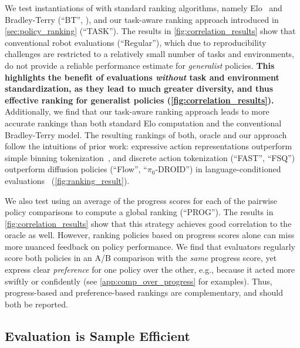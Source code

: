 We test instantiations of \Acronym{} with standard ranking algorithms, namely Elo~\citep{elo1967proposed} and Bradley-Terry (``BT'', \citep{bradley1952rank}), and our task-aware ranking approach introduced in \cref{sec:policy_ranking} (``TASK''). The results in \cref{fig:correlation_results} show that conventional robot evaluations (``Regular''), which due to reproducibility challenges are restricted to a relatively small number of tasks and environments, do not provide a reliable performance estimate for \emph{generalist} policies. \textbf{This highlights the benefit of evaluations \emph{without} task and environment standardization, as they lead to much greater diversity, and thus effective ranking for generalist policies (\cref{fig:correlation_results}).} Additionally, we find that our task-aware ranking approach leads to more accurate rankings than both standard Elo computation and the conventional Bradley-Terry model. 
The resulting rankings of both, oracle and our approach follow the intuitions of prior work: expressive action representations outperform simple binning tokenization~\citep{pertsch2025fast, lee2024behavior, black2024pi_0, chi2023diffusion}, and discrete action tokenization (``FAST'', ``FSQ'') outperform diffusion policies (``Flow'', ``$\pi_0$-DROID'') in language-conditioned evaluations~\citep{pertsch2025fast, intelligence2025pi} (\cref{fig:ranking_result}). 

We also test using an average of the progress scores for each of the pairwise policy comparisons to compute a global ranking (``PROG''). The results in \cref{fig:correlation_results} show that this strategy achieves good correlation to the oracle as well. However, ranking policies based on progress scores alone can miss more nuanced feedback on policy performance. We find that evaluators regularly score both policies in an A/B comparison with the \emph{same} progress score, yet express clear \emph{preference} for one policy over the other, e.g., because it acted more swiftly or confidently (see \cref{app:comp_over_progress} for examples). Thus, progress-based and preference-based rankings are complementary, and should both be reported.%


\subsection{\Acronym{} Evaluation is Sample Efficient}


